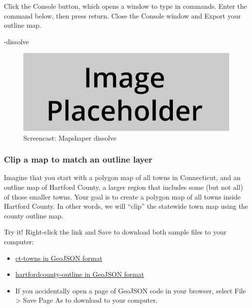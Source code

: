 \documentclass[
  english,
]{book}
\newenvironment{Shaded}{\begin{snugshade}}{\end{snugshade}}
\newcommand{\NormalTok}[1]{#1}
\providecommand{\tightlist}{%
  \setlength{\itemsep}{0pt}\setlength{\parskip}{0pt}}
\begin{document}
Click the Console button, which opens a window to type in commands. Enter the command below, then press return. Close the Console window and Export your outline map.

\begin{Shaded}
\begin{Highlighting}[]
\NormalTok{{-}dissolve}
\end{Highlighting}
\end{Shaded}

\begin{figure}
\centering
\includegraphics{images/placeholder.jpg}
\caption{\label{fig:mapshaper-dissolve}Screencast: Mapshaper dissolve}
\end{figure}

\hypertarget{clip-a-map-to-match-an-outline-layer}{%
\subsubsection*{Clip a map to match an outline layer}\label{clip-a-map-to-match-an-outline-layer}}

Imagine that you start with a polygon map of all towns in Connecticut, and an outline map of Hartford County, a larger region that includes some (but not all) of those smaller towns. Your goal is to create a polygon map of all towns inside Hartford County. In other words, we will ``clip'' the statewide town map using the county outline map.

Try it! Right-click the link and Save to download both sample files to your computer:

\begin{itemize}
\tightlist
\item
  \href{data/ct-towns.geojson}{ct-towns in GeoJSON format}
\item
  \href{data/hartfordcounty-outline.geojson}{hartfordcounty-outline in GeoJSON format}
\item
  If you accidentally open a page of GeoJSON code in your browser, select File \textgreater{} Save Page As to download to your computer.
\end{itemize}
\end{document}
